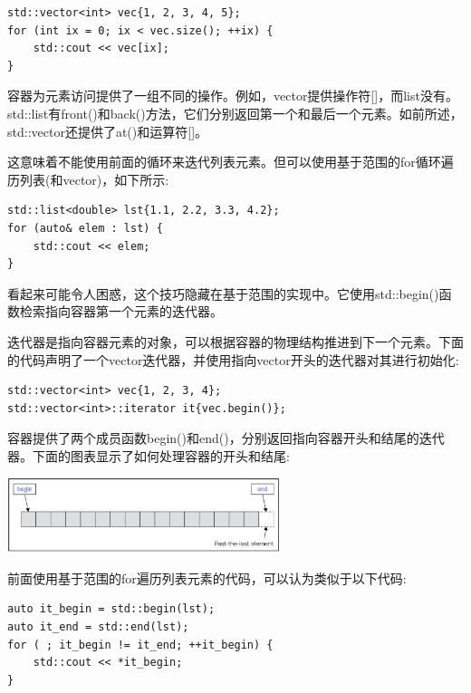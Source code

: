 \begin{lstlisting}[caption={}]
std::vector<int> vec{1, 2, 3, 4, 5};
for (int ix = 0; ix < vec.size(); ++ix) {
	std::cout << vec[ix];
}
\end{lstlisting}

容器为元素访问提供了一组不同的操作。例如，vector提供操作符[]，而list没有。std::list有front()和back()方法，它们分别返回第一个和最后一个元素。如前所述，std::vector还提供了at()和运算符[]。 \par
这意味着不能使用前面的循环来迭代列表元素。但可以使用基于范围的for循环遍历列表(和vector)，如下所示: \par

\begin{lstlisting}[caption={}]
std::list<double> lst{1.1, 2.2, 3.3, 4.2};
for (auto& elem : lst) {
	std::cout << elem;
}
\end{lstlisting}

看起来可能令人困惑，这个技巧隐藏在基于范围的实现中。它使用std::begin()函数检索指向容器第一个元素的迭代器。 \par 
迭代器是指向容器元素的对象，可以根据容器的物理结构推进到下一个元素。下面的代码声明了一个vector迭代器，并使用指向vector开头的迭代器对其进行初始化: \par

\begin{lstlisting}[caption={}]
std::vector<int> vec{1, 2, 3, 4};
std::vector<int>::iterator it{vec.begin()};
\end{lstlisting}

容器提供了两个成员函数begin()和end()，分别返回指向容器开头和结尾的迭代器。下面的图表显示了如何处理容器的开头和结尾: \par

\begin{center}
	\includegraphics[width=0.6\textwidth]{content/Section-2/Chapter-6/18}
\end{center}

前面使用基于范围的for遍历列表元素的代码，可以认为类似于以下代码: \par

\begin{lstlisting}[caption={}]
auto it_begin = std::begin(lst);
auto it_end = std::end(lst);
for ( ; it_begin != it_end; ++it_begin) {
	std::cout << *it_begin;
}
\end{lstlisting}

